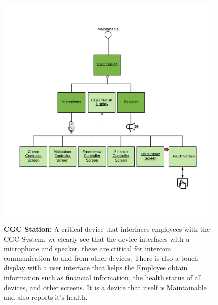 \documentclass[12pt]{article}
\begin{document}
\begin{figure}[H]
    \centerline{\includegraphics[scale=.20]{CGCStation.png}}
    \caption{\textbf{CGC Station: } A critical device that interfaces employees with the CGC System. we 
clearly see that the device interfaces with a microphone and speaker. these are critical for 
intercom communication to and from other devices. There is also a touch display with a user interface 
that helps the Employee  obtain information such as financial information, the health status of all 
devices, and other screens. It is a device that itself is Maintainable and also reports it's health.}
    \label{fig:CGCStation}
\end{figure}
  
\end{document}
